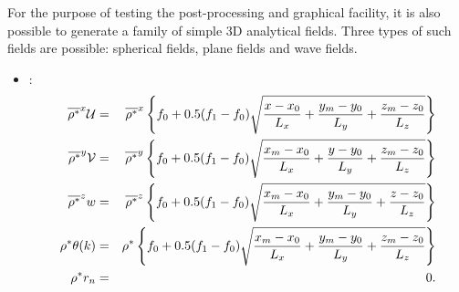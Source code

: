 For the purpose of testing the post-processing and graphical facility, it
is also possible to generate a family of simple 3D analytical fields.
Three types of such fields are possible: spherical fields, plane
fields and wave fields.
\begin{itemize}
\item {}:
\begin{eqnarray}
\overline{\rho^{*}}^{x} {\cal U} & = &  \overline{\rho^{*}}^{x}
\left\{ f_{0} + 0.5  (f_{1}- f_{0}) \sqrt{\dfrac{x-x_{0}}{L_{x}}
+ \dfrac{y_{m}-y_{0}}{L_{y}} + \dfrac{z_{m}-z_{0}}{L_{z}}}    \right\}
\\
\overline{\rho^{*}}^{y}{\cal V} & = &    \overline{\rho^{*}}^{y}
\left\{ f_{0} + 0.5  (f_{1}- f_{0}) \sqrt{\dfrac{x_{m}-x_{0}}{L_{x}}
+ \dfrac{y-y_{0}}{L_{y}} + \dfrac{z_{m}-z_{0}}{L_{z}}}    \right\}
\\
\overline{ \rho^{*}}^{z} w & = &  \overline{\rho^{*}}^{z}
\left\{ f_{0} + 0.5  (f_{1}- f_{0}) \sqrt{\dfrac{x_{m}-x_{0}}{L_{x}}
+ \dfrac{y_{m}-y_{0}}{L_{y}} + \dfrac{z-z_{0}}{L_{z}}}    \right\}
 \\
\rho^{*} \theta(k) & = &   \rho^{*} \left\{ f_{0}
+ 0.5  (f_{1}- f_{0}) \sqrt{\dfrac{x_{m}-x_{0}}{L_{x}}
+ \dfrac{y_{m}-y_{0}}{L_{y}} + \dfrac{z_{m}-z_{0}}{L_{z}}}    \right\}
\\
\rho^{*} r_{n} & = & 0.
\end{eqnarray}


\end{itemize}

